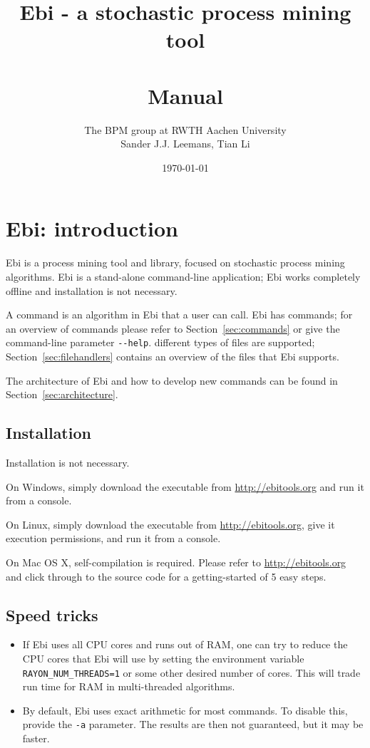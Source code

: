 \documentclass{article}
\title{Ebi - a stochastic process mining tool\\{\small\version}\\Manual}
\author{The BPM group at RWTH Aachen University\\
Sander J.J. Leemans, Tian Li}
\date{\today}
\begin{document}
\maketitle

\tableofcontents

\clearpage
\section{Ebi: introduction}
	Ebi is a process mining tool and library, focused on stochastic process mining algorithms.
	Ebi is a stand-alone command-line application; Ebi works completely offline and installation is not necessary.
		
	A command is an algorithm in Ebi that a user can call.
	Ebi has \numberofcommands{} commands; for an overview of commands please refer to Section~\ref{sec:commands} or give the command-line parameter \verb=--help=.
	\numberoffilehandlers{} different types of files are supported; Section~\ref{sec:filehandlers} contains an overview of the files that Ebi supports.
	
	The architecture of Ebi and how to develop new commands can be found in Section~\ref{sec:architecture}.
	
	\subsection{Installation}
		Installation is not necessary.
		
		On Windows, simply download the executable from \url{http://ebitools.org} and run it from a console.
		
		On Linux, simply download the executable from \url{http://ebitools.org}, give it execution permissions, and run it from a console.
		
		On Mac OS X, self-compilation is required. 
		Please refer to \url{http://ebitools.org} and click through to the source code for a getting-started of 5 easy steps.
	
	\subsection{Speed tricks}
		\begin{itemize}
			\item If Ebi uses all CPU cores and runs out of RAM, one can try to reduce the CPU cores that Ebi will use by setting the environment variable \verb!RAYON_NUM_THREADS=1! or some other desired number of cores.
			This will trade run time for RAM in multi-threaded algorithms.
			\item By default, Ebi uses exact arithmetic for most commands.
			To disable this, provide the \verb=-a= parameter.
			The results are then not guaranteed, but it may be faster.
		\end{itemize}
\end{document}

